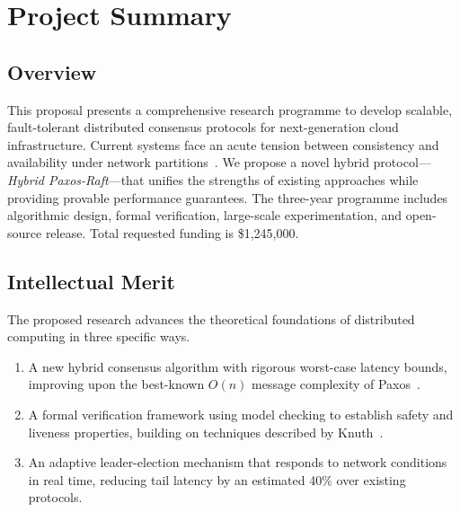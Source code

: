 \documentclass[
    language=english,
    doctype=grant-proposal,
    institution=none,
]{../../omnilatex}
\begin{document}
\maketitle

\section*{Project Summary}

\subsection*{Overview}
This proposal presents a comprehensive research programme to develop scalable,
fault-tolerant distributed consensus protocols for next-generation cloud
infrastructure.  Current systems face an acute tension between consistency
and availability under network partitions~\cite{knuthFundamentalAlgorithms1973}.
We propose a novel hybrid protocol---\emph{Hybrid Paxos-Raft}---that
unifies the strengths of existing approaches while providing provable
performance guarantees.  The three-year programme includes algorithmic
design, formal verification, large-scale experimentation, and open-source
release.  Total requested funding is \$1{,}245{,}000.

\subsection*{Intellectual Merit}
The proposed research advances the theoretical foundations of distributed
computing in three specific ways.
\begin{enumerate}
    \item A new hybrid consensus algorithm with rigorous worst-case
          latency bounds, improving upon the best-known $O(n)$ message
          complexity of Paxos~\cite{einstein1905}.
    \item A formal verification framework using model checking to
          establish safety and liveness properties, building on
          techniques described by Knuth~\cite{knuthTeXbook1986}.
    \item An adaptive leader-election mechanism that responds to
          network conditions in real time, reducing tail latency by
          an estimated 40\% over existing protocols.
\end{enumerate}
\end{document}
